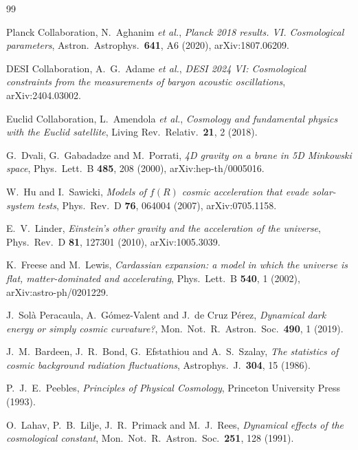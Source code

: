 \documentclass[11pt,a4paper]{article}
\theoremstyle{definition}
\begin{document}
{\setlength{\parskip}{0.15em}\small
\begin{thebibliography}{99}

Planck Collaboration, N.~Aghanim \emph{et al.},
\emph{Planck 2018 results. VI. Cosmological parameters},
Astron.\ Astrophys.\ \textbf{641}, A6 (2020), arXiv:1807.06209.

DESI Collaboration, A.~G.~Adame \emph{et al.},
\emph{DESI 2024 VI: Cosmological constraints from the measurements of
baryon acoustic oscillations},
arXiv:2404.03002.

Euclid Collaboration, L.~Amendola \emph{et al.},
\emph{Cosmology and fundamental physics with the Euclid satellite},
Living Rev.\ Relativ.\ \textbf{21}, 2 (2018).

G.~Dvali, G.~Gabadadze and M.~Porrati,
\emph{4D gravity on a brane in 5D Minkowski space},
Phys.\ Lett.\ B \textbf{485}, 208 (2000), arXiv:hep-th/0005016.

W.~Hu and I.~Sawicki,
\emph{Models of $f(R)$ cosmic acceleration that evade solar-system tests},
Phys.\ Rev.\ D \textbf{76}, 064004 (2007), arXiv:0705.1158.

E.~V.~Linder,
\emph{Einstein's other gravity and the acceleration of the universe},
Phys.\ Rev.\ D \textbf{81}, 127301 (2010), arXiv:1005.3039.

K.~Freese and M.~Lewis,
\emph{Cardassian expansion: a model in which the universe is flat,
matter-dominated and accelerating},
Phys.\ Lett.\ B \textbf{540}, 1 (2002), arXiv:astro-ph/0201229.

J.~Sol\`a Peracaula, A.~G\'omez-Valent and J.~de Cruz P\'erez,
\emph{Dynamical dark energy or simply cosmic curvature?},
Mon.\ Not.\ R.\ Astron.\ Soc.\ \textbf{490}, 1 (2019).

J.~M.~Bardeen, J.~R.~Bond, G.~Efstathiou and A.~S.~Szalay,
\emph{The statistics of cosmic background radiation fluctuations},
Astrophys.\ J.\ \textbf{304}, 15 (1986).

P.~J.~E.~Peebles,
\emph{Principles of Physical Cosmology},
Princeton University Press (1993).

O.~Lahav, P.~B.~Lilje, J.~R.~Primack and M.~J.~Rees,
\emph{Dynamical effects of the cosmological constant},
Mon.\ Not.\ R.\ Astron.\ Soc.\ \textbf{251}, 128 (1991).


\end{thebibliography}}
\end{document}
